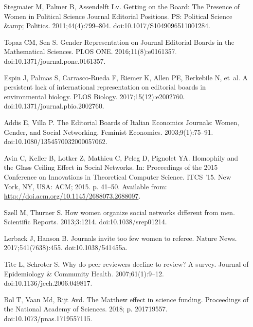 \documentclass[10pt,letterpaper]{article}
\begin{document}
\begin{thebibliography}{100}
Stegmaier M, Palmer B, Assendelft Lv.
\newblock Getting on the {Board}: {The} {Presence} of {Women} in {Political}
  {Science} {Journal} {Editorial} {Positions}.
\newblock PS: Political Science \&amp; Politics. 2011;44(4):799--804.
\newblock doi:{10.1017/S1049096511001284}.

Topaz CM, Sen S.
\newblock Gender {Representation} on {Journal} {Editorial} {Boards} in the
  {Mathematical} {Sciences}.
\newblock PLOS ONE. 2016;11(8):e0161357.
\newblock doi:{10.1371/journal.pone.0161357}.

Espin J, Palmas S, Carrasco-Rueda F, Riemer K, Allen PE, Berkebile N, et~al.
\newblock A persistent lack of international representation on editorial boards
  in environmental biology.
\newblock PLOS Biology. 2017;15(12):e2002760.
\newblock doi:{10.1371/journal.pbio.2002760}.

Addis E, Villa P.
\newblock The {Editorial} {Boards} of {Italian} {Economics} {Journals}:
  {Women}, {Gender}, and {Social} {Networking}.
\newblock Feminist Economics. 2003;9(1):75--91.
\newblock doi:{10.1080/1354570032000057062}.

Avin C, Keller B, Lotker Z, Mathieu C, Peleg D, Pignolet YA.
\newblock Homophily and the {Glass} {Ceiling} {Effect} in {Social} {Networks}.
\newblock In: Proceedings of the 2015 {Conference} on {Innovations} in
  {Theoretical} {Computer} {Science}. {ITCS} '15. New York, NY, USA: ACM; 2015.
  p. 41--50.
\newblock Available from: \url{http://doi.acm.org/10.1145/2688073.2688097}.

Szell M, Thurner S.
\newblock How women organize social networks different from men.
\newblock Scientific Reports. 2013;3:1214.
\newblock doi:{10.1038/srep01214}.

Lerback J, Hanson B.
\newblock Journals invite too few women to referee.
\newblock Nature News. 2017;541(7638):455.
\newblock doi:{10.1038/541455a}.

Tite L, Schroter S.
\newblock Why do peer reviewers decline to review? {A} survey.
\newblock Journal of Epidemiology \& Community Health. 2007;61(1):9--12.
\newblock doi:{10.1136/jech.2006.049817}.

Bol T, Vaan Md, Rijt Avd.
\newblock The {Matthew} effect in science funding.
\newblock Proceedings of the National Academy of Sciences. 2018; p. 201719557.
\newblock doi:{10.1073/pnas.1719557115}.


\end{thebibliography}
\end{document}
